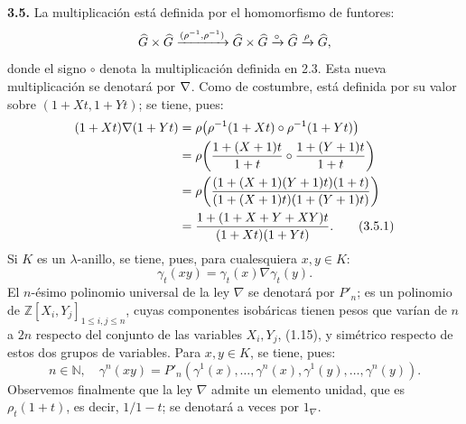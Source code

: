 \textbf{3.5.} La multiplicación está definida por el homomorfismo de funtores:
\[
  \Ghat\times\Ghat\xrightarrow{(\rho^{-1},\rho^{-1})}
  \Ghat\times\Ghat\xrightarrow{\circ}\Ghat\xrightarrow{\rho}\Ghat ,
\]
donde el signo \(\circ\) denota la multiplicación definida en 2.3. Esta nueva multiplicación se denotará por \(\sisi{v}{\nabla}\). Como de costumbre, está definida por su valor sobre \((1+Xt,1+Yt)\); se tiene, pues:
\begin{align}
 (1+Xt)\nabla(1+Yt)
 &=\rho\!\left(\rho^{-1}(1+Xt)\circ\rho^{-1}(1+Yt)\right) \notag\\
 &=\rho\!\left(\frac{1+(X+1)t}{1+t}\circ
                 \frac{1+(Y+1)t}{1+t}\right) \notag\\
 &=\rho\!\left(\frac{(1+(X+1)(Y+1)t)(1+t)}
                      {(1+(X+1)t)(1+(Y+1)t)}\right) \notag\\
 &=\frac{1+(1+X+Y+XY)t}{(1+Xt)(1+Yt)} . \tag{3.5.1}
\end{align}
Si \(K\) es un \(\lambda\)-anillo, se tiene, pues, para cualesquiera \(x,y\in K\):
\begin{equation}\tag{3.5.2}
  \gamma_t(xy)=\gamma_t(x)\nabla\gamma_t(y).
\end{equation}
El \(n\)-ésimo polinomio universal de la ley \(\nabla\) se denotará por \(P'_n\); es un polinomio de \(\mathbb Z[X_i,Y_j]_{1\le i,j\le n}\), cuyas componentes isobáricas tienen pesos que varían de \(n\) a \(2n\) respecto del conjunto de las variables \(X_i,Y_j\), (1.15), y simétrico respecto de estos dos grupos de variables. Para \(x,y\in K\), se tiene, pues:
\begin{equation}\tag{3.5.3}
  n\in\mathbb N,\quad \gamma^n(xy)
  =P'_n(\gamma^1(x),\ldots,\gamma^n(x),
       \gamma^1(y),\ldots,\gamma^n(y)).
\end{equation}
Observemos finalmente que la ley \(\nabla\) admite un elemento unidad, que es \(\rho_t(1+t)\), es decir, \(1/1-t\); se denotará a veces por \(1_\nabla\).

